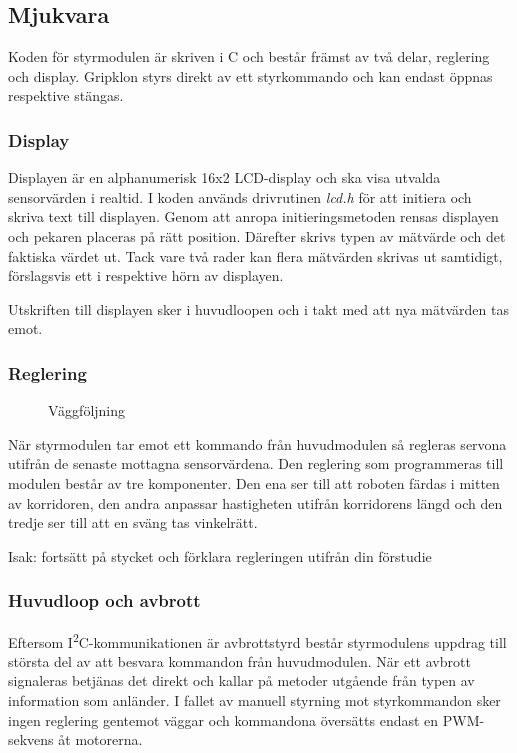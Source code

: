 \documentclass[11pt]{article}
\begin{document}
\begin{flushleft}
\subsection{Mjukvara}
Koden för styrmodulen är skriven i C och består främst av två delar, reglering och display. Gripklon styrs direkt av ett styrkommando och kan endast öppnas respektive stängas.


\subsubsection{Display}
Displayen är en alphanumerisk 16x2 LCD-display och ska visa utvalda sensorvärden i realtid. I koden används drivrutinen \emph{lcd.h} för att initiera och skriva text till displayen. Genom att anropa initieringsmetoden rensas displayen och pekaren placeras på rätt position. Därefter skrivs typen av mätvärde och det faktiska värdet ut. Tack vare två rader kan flera mätvärden skrivas ut samtidigt, förslagsvis ett i respektive hörn av displayen.

Utskriften till displayen sker i huvudloopen och i takt med att nya mätvärden tas emot.

\subsubsection{Reglering} \label{mjukvarureglering}
\begin{figure}[H] 
\centering
\noindent{}
	\caption{Väggföljning\label{robotwall}}	
\end{figure}

När styrmodulen tar emot ett kommando från huvudmodulen så regleras servona utifrån de senaste mottagna sensorvärdena. Den reglering som programmeras till modulen består av tre komponenter. Den ena ser till att roboten färdas i mitten av korridoren, den andra anpassar hastigheten utifrån korridorens längd och den tredje ser till att en sväng tas vinkelrätt.

Isak: fortsätt på stycket och förklara regleringen utifrån din förstudie

\subsubsection{Huvudloop och avbrott}
Eftersom I\textsuperscript{2}C-kommunikationen är avbrottstyrd består styrmodulens uppdrag till största del av att besvara kommandon från huvudmodulen. När ett avbrott signaleras betjänas det direkt och kallar på metoder utgående från typen av information som anländer. I fallet av manuell styrning mot styrkommandon sker ingen reglering gentemot väggar och kommandona översätts endast en PWM-sekvens åt motorerna.


\end{flushleft}
\end{document}
